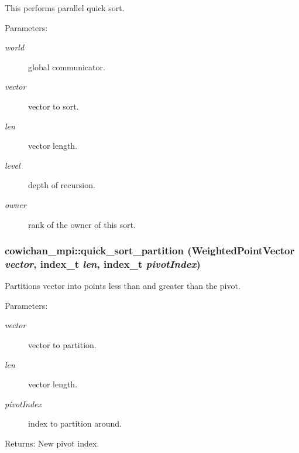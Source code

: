 This performs parallel quick sort. \begin{Desc}
\item[Parameters:]
\begin{description}
\item[{\em world}]global communicator. \item[{\em vector}]vector to sort. \item[{\em len}]vector length. \item[{\em level}]depth of recursion. \item[{\em owner}]rank of the owner of this sort. \end{description}
\end{Desc}
\hypertarget{namespacecowichan__mpi_83904b95f448398ff15331182ee0c007}{
\subsubsection[{quick\_\-sort\_\-partition}]{ cowichan\_\-mpi::quick\_\-sort\_\-partition ({\bf WeightedPointVector} {\em vector}, \/  {\bf index\_\-t} {\em len}, \/  {\bf index\_\-t} {\em pivotIndex})}}
\label{namespacecowichan__mpi_83904b95f448398ff15331182ee0c007}


Partitions vector into points less than and greater than the pivot. \begin{Desc}
\item[Parameters:]
\begin{description}
\item[{\em vector}]vector to partition. \item[{\em len}]vector length. \item[{\em pivotIndex}]index to partition around. \end{description}
\end{Desc}
\begin{Desc}
\item[Returns:]New pivot index. \end{Desc}

